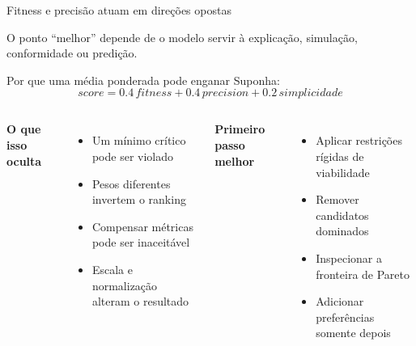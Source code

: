 \documentclass[aspectratio=169,11pt]{beamer}
\begin{document}
\begin{frame}{Fitness e precisão atuam em direções opostas}
  \centering
  \par
  \vspace{0.25cm}
  O ponto ``melhor'' depende de o modelo servir à explicação, simulação, conformidade ou predição.
\end{frame}

\begin{frame}{Por que uma média ponderada pode enganar}
  Suponha:
  \[
    score = 0.4\,fitness + 0.4\,precision + 0.2\,simplicidade
  \]
  \begin{columns}[T,onlytextwidth]
      \textbf{O que isso oculta}
      \begin{itemize}
        \item Um mínimo crítico pode ser violado
        \item Pesos diferentes invertem o ranking
        \item Compensar métricas pode ser inaceitável
        \item Escala e normalização alteram o resultado
      \end{itemize}
      \textbf{Primeiro passo melhor}
      \begin{itemize}
        \item Aplicar restrições rígidas de viabilidade
        \item Remover candidatos dominados
        \item Inspecionar a fronteira de Pareto
        \item Adicionar preferências somente depois
      \end{itemize}
  \end{columns}
\end{frame}
\end{document}
